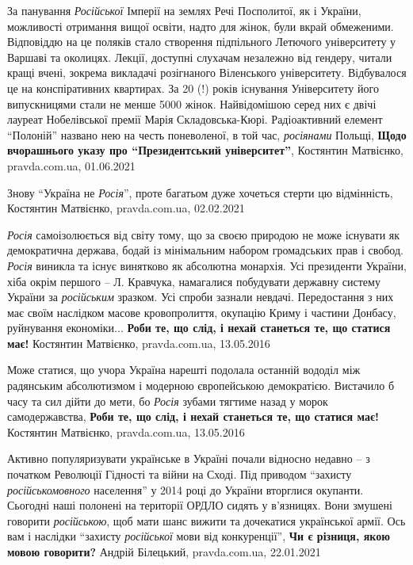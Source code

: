 За панування \emph{Російської} Імперії на землях Речі Посполитої, як і України,
можливості отримання вищої освіти, надто для жінок, були вкрай обмеженими.
Відповіддю на це поляків стало створення підпільного Летючого університету у
Варшаві та околицях. Лекції, доступні слухачам незалежно від гендеру, читали
кращі вчені, зокрема викладачі розігнаного Віленського університету.
Відбувалося це на конспіративних квартирах. За 20 (!) років існування
Університету його випускницями стали не менше 5000 жінок. Найвідомішою серед
них є двічі лауреат Нобелівської премії Марія Складовська-Кюрі. Радіоактивний
елемент \enquote{Полоній} названо нею на честь поневоленої, в той час, \emph{росіянами}
Польщі, 
\textbf{Щодо вчорашнього указу про \enquote{Президентський університет}}, Костянтин Матвієнко, pravda.com.ua, 01.06.2021

Знову \enquote{Україна не \emph{Росія}}, проте багатьом дуже хочеться стерти цю відмінність,
Костянтин Матвієнко, pravda.com.ua, 02.02.2021

\emph{Росія} самоізолюється від світу тому, що за своєю природою не може існувати як
демократична держава, бодай із мінімальним набором громадських прав і свобод.
\emph{Росія} виникла та існує винятково як абсолютна монархія. Усі президенти України,
хіба окрім першого – Л. Кравчука, намагалися побудувати державну систему
України за \emph{російським} зразком. Усі спроби зазнали невдачі. Передостання з них
має своїм наслідком масове кровопролиття, окупацію Криму і частини Донбасу,
руйнування економіки...
\textbf{Роби те, що слід, і нехай станеться те, що статися має!}
Костянтин Матвієнко, pravda.com.ua, 13.05.2016

Може статися, що учора Україна нарешті подолала останній вододіл між радянським
абсолютизмом і модерною європейською демократією. Вистачило б часу та сил дійти
до мети, бо \emph{Росія} зубами тягтиме назад у морок самодержавства,
\textbf{Роби те, що слід, і нехай станеться те, що статися має!}
Костянтин Матвієнко, pravda.com.ua, 13.05.2016

Активно популяризувати українське в Україні почали відносно недавно – з
початком Революції Гідності та війни на Сході. Під приводом \enquote{захисту
\emph{російськомовного} населення} у 2014 році до України вторглися окупанти. Сьогодні
наші полонені на території ОРДЛО сидять у в'язницях. Вони змушені говорити
\emph{російською}, щоб мати шанс вижити та дочекатися української армії. Ось вам і
наслідки \enquote{захисту \emph{російської} мови від конкуренції},
\textbf{Чи є різниця, якою мовою говорити?} Андрій Білецький, pravda.com.ua, 22.01.2021


